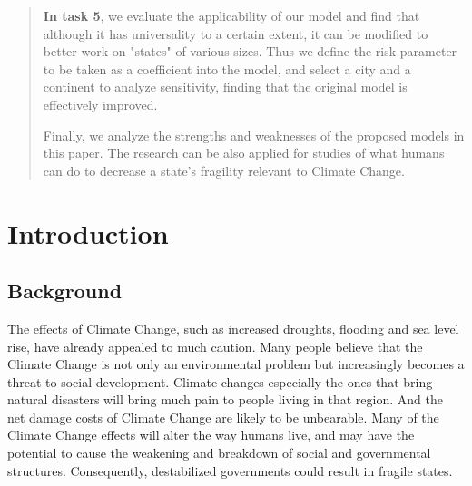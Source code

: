 \documentclass[a4paper,12pt]{article}
\begin{document}
\begin{abstract}
\textbf{In task 5}, we evaluate the applicability of our model and find that although it has universality to a certain extent, it can be modified to better work on "states" of various sizes. Thus we define the risk parameter to be taken as a coefficient into the model, and select a city and a continent to analyze sensitivity, finding that the original model is effectively improved.

Finally, we analyze the strengths and weaknesses of the proposed models in this paper. The research can be also applied for studies of what humans can do to decrease a state's fragility relevant to Climate Change.



\end{abstract}

\maketitle
\thispagestyle{empty}

\newpage
\setcounter{tocdepth}{3}
\tableofcontents
\thispagestyle{empty}
\newpage

\setlength\parskip{0.8\baselineskip}
\setcounter{page}{1}
\pagestyle{fancy}

\section{Introduction}
\subsection{Background}

The effects of Climate Change, such as increased droughts, flooding and sea level rise, have already appealed to much caution. Many people believe that the Climate Change is not only an environmental problem but increasingly becomes a threat to social development. Climate changes especially the ones that bring natural disasters will bring much pain to people living in that region. And the net damage costs of Climate Change are likely to be unbearable. Many of the Climate Change effects will alter the way humans live, and may have the potential to cause the weakening and breakdown of social and governmental structures. Consequently, destabilized governments could result in fragile states.
\end{document}
